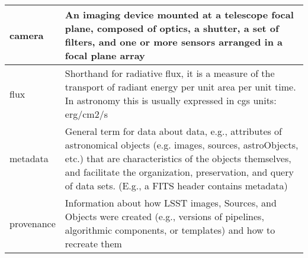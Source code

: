 \begin{longtable}{|p{}|p{}|}
camera & An imaging device mounted at a telescope focal plane, composed of optics, a shutter, a set of filters, and one or more sensors arranged in a focal plane array \\\hline
flux & Shorthand for radiative \gls{flux}, it is a measure of the transport of radiant energy per unit area per unit time. In astronomy this is usually expressed in cgs units: erg/cm2/s \\\hline
metadata & General term for data about data, e.g., attributes of astronomical objects (e.g. images, sources, astroObjects, etc.) that are characteristics of the objects themselves, and facilitate the organization, preservation, and query of data sets. (E.g., a \gls{FITS} header contains \gls{metadata}) \\\hline
provenance & Information about how \gls{LSST} images, Sources, and Objects were created (e.g., versions of pipelines, algorithmic components, or templates) and how to recreate them \\\hline
\end{longtable}
